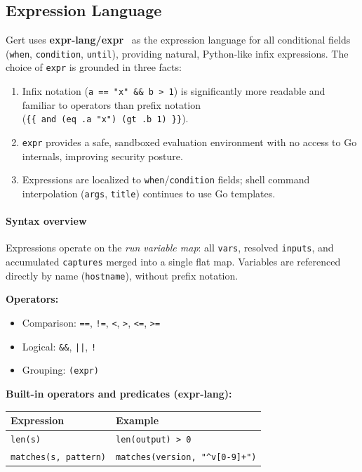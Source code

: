 \subsection{Expression Language}
\label{subsec:expressions}

Gert uses \textbf{expr-lang/expr}~\cite{expr-lang-docs} as the expression language for all
conditional fields (\texttt{when}, \texttt{condition}, \texttt{until}), providing
natural, Python-like infix expressions.  The choice of \texttt{expr} is grounded in three facts:
\begin{enumerate}
  \item Infix notation (\texttt{a == "x" \&\& b > 1}) is significantly more
        readable and familiar to operators than prefix notation (\texttt{\{\{\ and\ (eq\ .a\ "x")\ (gt\ .b\ 1)\ \}\}}).
  \item \texttt{expr} provides a safe, sandboxed evaluation environment with no
        access to Go internals, improving security posture.
  \item Expressions are localized to
        \texttt{when}/\texttt{condition} fields; shell command interpolation
        (\texttt{args}, \texttt{title}) continues to use Go templates.
\end{enumerate}

\paragraph{Syntax overview}

Expressions operate on the \emph{run variable map}: all \texttt{vars}, resolved
\texttt{inputs}, and accumulated \texttt{captures} merged into a single flat
map.  Variables are referenced directly by name (\texttt{hostname}), without
prefix notation.

\textbf{Operators:}
\begin{itemize}
  \item Comparison: \texttt{==}, \texttt{!=}, \texttt{<}, \texttt{>}, \texttt{<=}, \texttt{>=}
  \item Logical: \texttt{\&\&}, \texttt{||}, \texttt{!}
  \item Grouping: \texttt{(expr)}
\end{itemize}

\textbf{Built-in operators and predicates (expr-lang):}
\begin{center}
\begin{tabular}{ll}
\hline
\textbf{Expression} & \textbf{Example} \\
\hline
\texttt{len(s)}                  & \texttt{len(output) > 0} \\
\texttt{matches(s, pattern)}     & \texttt{matches(version, "\^{}v[0-9]+")} \\
\hline
\end{tabular}
\end{center}

